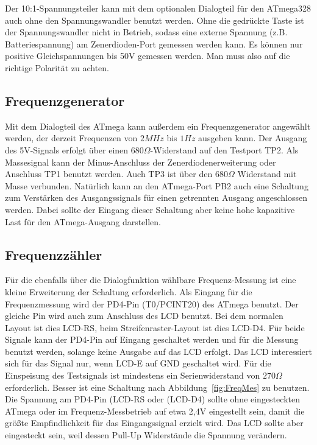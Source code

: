 Der 10:1-Spannungsteiler kann mit dem optionalen Dialogteil für den ATmega328 auch ohne 
den Spannungswandler benutzt werden. Ohne die gedrückte Taste ist der Spannungswandler nicht in 
Betrieb, sodass eine externe Spannung (z.B. Batteriespannung) am Zenerdioden-Port gemessen werden kann.
Es können nur positive Gleichspannungen bis 50V gemessen werden.
Man muss also auf die richtige Polarität zu achten.

\subsection{Frequenzgenerator}

Mit dem Dialogteil des ATmega kann außerdem ein Frequenzgenerator angewählt werden, der derzeit
Frequenzen von \(2 MHz\) bis \(1 Hz\) ausgeben kann. Der Ausgang des 5V-Signals erfolgt über
einen \(680\Omega\)-Widerstand auf den Testport TP2. Als Massesignal kann der Minus-Anschluss
der Zenerdiodenerweiterung oder Anschluss TP1 benutzt werden.
Auch TP3 ist über den \(680\Omega\) Widerstand mit Masse verbunden.
Natürlich kann an den ATmega-Port PB2 auch eine Schaltung zum Verstärken des Ausgangssignals 
für einen getrennten Ausgang angeschlossen werden. Dabei sollte der Eingang dieser Schaltung
aber keine hohe kapazitive Last für den ATmega-Ausgang darstellen.

\subsection{Frequenzzähler}

Für die ebenfalls über die Dialogfunktion wählbare Frequenz-Messung ist eine kleine Erweiterung
der Schaltung erforderlich. Als Eingang für die Frequenzmessung wird der PD4-Pin (T0/PCINT20) des
ATmega benutzt. Der gleiche Pin wird auch zum Anschluss des LCD benutzt. Bei dem normalen Layout
ist dies LCD-RS, beim Streifenraster-Layout ist dies LCD-D4. Für beide Signale kann der PD4-Pin
auf Eingang geschaltet werden und für die Messung benutzt werden, solange keine Ausgabe auf das
LCD erfolgt. Das LCD interessiert sich für das Signal nur, wenn LCD-E auf GND geschaltet wird.
Für die Einspeisung des Testsignals ist mindestens ein Serienwiderstand von \(270\Omega\) erforderlich.
Besser ist eine Schaltung nach Abbildung~\ref{fig:FreqMes} zu benutzen. Die Spannung am PD4-Pin (LCD-RS oder
(LCD-D4) sollte ohne eingesteckten ATmega oder im Frequenz-Messbetrieb auf etwa 2,4V eingestellt sein,
damit die größte Empfindlichkeit für das Eingangssignal erzielt wird. Das LCD sollte aber eingesteckt sein,
weil dessen Pull-Up Widerstände die Spannung verändern.

